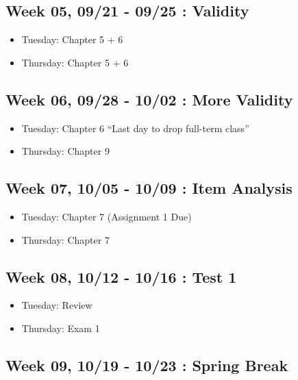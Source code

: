 \documentclass[11pt,]{article}
\providecommand{\tightlist}{%
  \setlength{\itemsep}{0pt}\setlength{\parskip}{0pt}}
\begin{document}
\hypertarget{week-05-0921---0925-validity}{%
\subsection{Week 05, 09/21 - 09/25 :
Validity}\label{week-05-0921---0925-validity}}

\begin{itemize}
\tightlist
\item
  Tuesday: Chapter 5 + 6
\item
  Thursday: Chapter 5 + 6
\end{itemize}

\hypertarget{week-06-0928---1002-more-validity}{%
\subsection{Week 06, 09/28 - 10/02 : More
Validity}\label{week-06-0928---1002-more-validity}}

\begin{itemize}
\tightlist
\item
  Tuesday: Chapter 6 ``Last day to drop full-term class''
\item
  Thursday: Chapter 9
\end{itemize}

\hypertarget{week-07-1005---1009-item-analysis}{%
\subsection{Week 07, 10/05 - 10/09 : Item
Analysis}\label{week-07-1005---1009-item-analysis}}

\begin{itemize}
\tightlist
\item
  Tuesday: Chapter 7 (Assignment 1 Due)
\item
  Thursday: Chapter 7
\end{itemize}

\hypertarget{week-08-1012---1016-test-1}{%
\subsection{Week 08, 10/12 - 10/16 : Test
1}\label{week-08-1012---1016-test-1}}

\begin{itemize}
\tightlist
\item
  Tuesday: Review
\item
  Thursday: Exam 1
\end{itemize}

\hypertarget{week-09-1019---1023-spring-break}{%
\subsection{Week 09, 10/19 - 10/23 : Spring
Break}\label{week-09-1019---1023-spring-break}}
\end{document}

